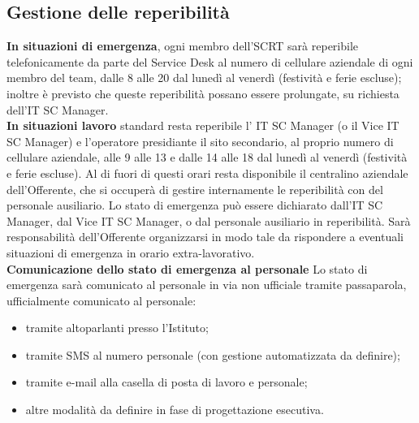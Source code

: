 \subsection{Gestione delle reperibilità}
\textbf{In situazioni di emergenza}, ogni membro dell'SCRT sarà reperibile telefonicamente da parte del Service Desk al numero di cellulare aziendale di ogni membro del team, dalle 8 alle 20 dal lunedì al venerdì (festività e ferie escluse); inoltre è previsto che queste reperibilità possano essere prolungate, su richiesta dell'IT SC Manager. \vspace{1cm}
\\
\textbf{In situazioni lavoro} standard resta reperibile l' IT SC Manager (o il Vice IT SC Manager) e l'operatore presidiante il sito secondario, al  proprio numero di cellulare aziendale, alle 9 alle 13 e dalle 14 alle 18 dal lunedì al venerdì (festività e ferie escluse). Al di fuori di questi orari resta disponibile il centralino aziendale dell'Offerente, che si occuperà di gestire internamente le reperibilità con del personale ausiliario. Lo stato di emergenza può essere dichiarato dall'IT SC Manager, dal Vice IT SC Manager, o dal personale ausiliario in reperibilità. Sarà responsabilità dell'Offerente organizzarsi in modo tale da rispondere a eventuali situazioni di emergenza in orario extra-lavorativo. 
\vspace{0.5cm} \\
\textbf{Comunicazione dello stato di emergenza al personale}
Lo stato di emergenza sarà comunicato al personale in via non ufficiale tramite passaparola, ufficialmente comunicato al personale:
\begin{itemize}
\item tramite altoparlanti presso l'Istituto;
\item tramite SMS al numero personale (con gestione automatizzata da definire);
\item tramite e-mail alla casella di posta di lavoro e personale;
\item altre modalità da definire in fase di progettazione esecutiva.
\end{itemize}

\newpage
